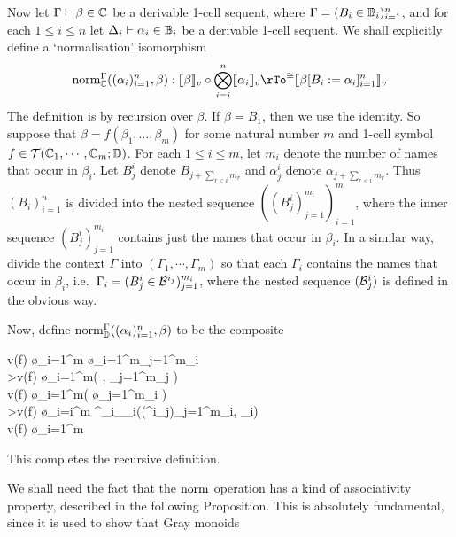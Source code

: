 \documentclass{robinthesisdraft}
\begin{document}
%
\begin{definition}
	Now let $\Gamma\vdash \beta\in\mathbb{C}$ be a derivable 1-cell sequent, where
	$\Gamma = (B_{i}\in\mathbb{B}_{i})_{i=1}^{n}$, and for each $1\leq i\leq n$
	let $\Delta_{i}\vdash \alpha_{i}\in\mathbb{B}_{i}$ be a derivable 1-cell sequent.
	We shall explicitly define a `normalisation' isomorphism
	\[
		\norm_{\C}^{\Gamma}((\alpha_{i})_{i=1}^{n},\beta)
			: \semint{\beta}\o\Tn_{i=i}^{n}\semint{\alpha_{i}}
			\rTo^{\cong}
			\semint{\beta[B_{i}:=\alpha_{i}]_{i=1}^{n}}
	\]
	The definition is by recursion over $\beta$. If $\beta = B_{1}$, then
	we use the identity. So suppose that $\beta = f(\beta_{1}, \dots, \beta_{m})$
	for some natural number $m$ and 1-cell symbol $f\in{\mathcal{T}}(\mathbb{C}_{1},\cdots,\mathbb{C}_{m};\mathbb{D})$.
	For each $1\leq i\leq m$, let $m_{i}$ denote the
	number of names that occur in $\beta_{i}$. Let $B^{i}_{j}$
	denote $B_{j+\sum_{r<i}m_{r}}$ and $\alpha^{i}_{j}$ denote
	$\alpha_{j+\sum_{r<i}m_{r}}$. Thus $(B_{i})_{i=1}^{n}$ is divided
	into the nested sequence $((B^{i}_{j})_{j=1}^{m_{i}})_{i=1}^{m}$,
	where the inner sequence $(B^{i}_{j})_{j=1}^{m_{i}}$ contains just
	the names that occur in $\beta_{i}$. In a similar way, divide the
	context $\Gamma$ into $(\Gamma_{1}, \cdots, \Gamma_{m})$ so that
	each $\Gamma_{i}$ contains the names that occur in $\beta_{i}$,
	i.e.\ $\Gamma_{i} = (B^{i}_{j}\in\mathcal{B}^{i_{j}})_{j=1}^{m_{i}}$, where
	the nested sequence $(\mathcal{B}^{i}_{j})$ is defined in the obvious way.

	Now, define $\mathrm{norm}^{\Gamma}_{\mathbb{D}}((\alpha_{i})_{i=1}^{n},\beta)$
	to be the composite
	\begin{diagram}
		v(f) \o \Tn_{i=1}^{m} \o \Tn_{i=1}^{m}\Tn_{j=1}^{m_{i}}
		\\
		\dTo>{v(f) \o \Ic_{i=1}^{m}( , \Tn_{j=1}^{m_{j}} )}
		\\
		v(f) \o \Tn_{i=1}^{m}(  \o \Tn_{j=1}^{m_{i}} )
		\\
		\dTo>{v(f) \o \Tn_{i=i}^{m} \norm^{\Gamma_{i}}_{\C_{i}}((\alpha^{i}_{j})_{j=1}^{m_{i}}, \beta_{i})}
		\\
		v(f) \o \Tn_{i=1}^{m}
	\end{diagram}
	This completes the recursive definition.
\end{definition}
We shall need the fact that the $\mathrm{norm}$ operation has a kind of
associativity property, described in the following Proposition.
This is absolutely fundamental, since it is used to show that Gray monoids
\end{document}
